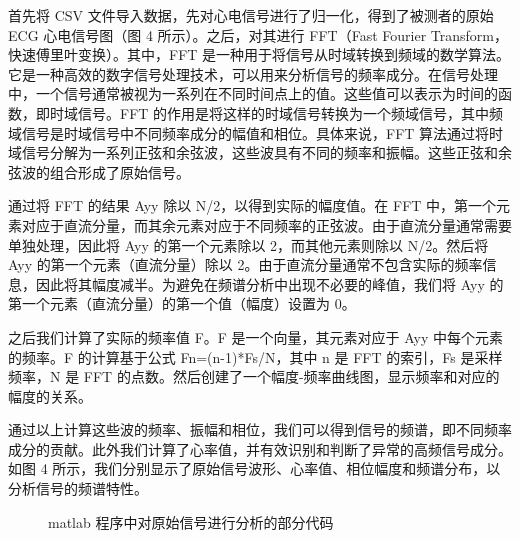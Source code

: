 \documentclass[a4paper,12pt]{article}
\begin{document}
首先将 CSV 文件导入数据，先对心电信号进行了归一化，得到了被测者的原始 ECG 心电信号图（图 4 所示）。之后，对其进行 FFT（Fast Fourier Transform，快速傅里叶变换）。其中，FFT 是一种用于将信号从时域转换到频域的数学算法。它是一种高效的数字信号处理技术，可以用来分析信号的频率成分。在信号处理中，一个信号通常被视为一系列在不同时间点上的值。这些值可以表示为时间的函数，即时域信号。FFT 的作用是将这样的时域信号转换为一个频域信号，其中频域信号是时域信号中不同频率成分的幅值和相位。具体来说，FFT 算法通过将时域信号分解为一系列正弦和余弦波，这些波具有不同的频率和振幅。这些正弦和余弦波的组合形成了原始信号。

通过将 FFT 的结果 Ayy 除以 N/2，以得到实际的幅度值。在 FFT 中，第一个元素对应于直流分量，而其余元素对应于不同频率的正弦波。由于直流分量通常需要单独处理，因此将 Ayy 的第一个元素除以 2，而其他元素则除以 N/2。然后将 Ayy 的第一个元素（直流分量）除以 2。由于直流分量通常不包含实际的频率信息，因此将其幅度减半。为避免在频谱分析中出现不必要的峰值，我们将 Ayy 的第一个元素（直流分量）的第一个值（幅度）设置为 0。

之后我们计算了实际的频率值 F。F 是一个向量，其元素对应于 Ayy 中每个元素的频率。F 的计算基于公式 Fn=(n-1)*Fs/N，其中 n 是 FFT 的索引，Fs 是采样频率，N 是 FFT 的点数。然后创建了一个幅度-频率曲线图，显示频率和对应的幅度的关系。

通过以上计算这些波的频率、振幅和相位，我们可以得到信号的频谱，即不同频率成分的贡献。此外我们计算了心率值，并有效识别和判断了异常的高频信号成分。如图 4 所示，我们分别显示了原始信号波形、心率值、相位幅度和频谱分布，以分析信号的频谱特性。

\begin{figure}[H]
    \centering
    \caption{matlab 程序中对原始信号进行分析的部分代码}
\end{figure}
\end{document}
